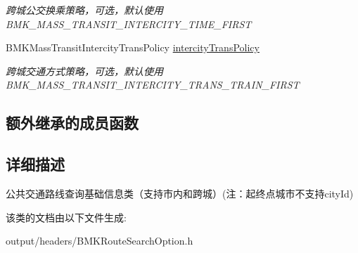 \begin{DoxyCompactItemize}
\begin{DoxyCompactList}\small\item\em 跨城公交换乘策略，可选，默认使用\+B\+M\+K\+\_\+\+M\+A\+S\+S\+\_\+\+T\+R\+A\+N\+S\+I\+T\+\_\+\+I\+N\+T\+E\+R\+C\+I\+T\+Y\+\_\+\+T\+I\+M\+E\+\_\+\+F\+I\+R\+S\+T \end{DoxyCompactList}\item 
\hypertarget{interface_b_m_k_mass_transit_route_plan_option_ae19aae7860e23063295101f1cc0000d5}{}B\+M\+K\+Mass\+Transit\+Intercity\+Trans\+Policy \hyperlink{interface_b_m_k_mass_transit_route_plan_option_ae19aae7860e23063295101f1cc0000d5}{intercity\+Trans\+Policy}\label{interface_b_m_k_mass_transit_route_plan_option_ae19aae7860e23063295101f1cc0000d5}

\begin{DoxyCompactList}\small\item\em 跨城交通方式策略，可选，默认使用\+B\+M\+K\+\_\+\+M\+A\+S\+S\+\_\+\+T\+R\+A\+N\+S\+I\+T\+\_\+\+I\+N\+T\+E\+R\+C\+I\+T\+Y\+\_\+\+T\+R\+A\+N\+S\+\_\+\+T\+R\+A\+I\+N\+\_\+\+F\+I\+R\+S\+T \end{DoxyCompactList}\end{DoxyCompactItemize}
\subsection*{额外继承的成员函数}


\subsection{详细描述}
公共交通路线查询基础信息类（支持市内和跨城）(注：起终点城市不支持city\+Id) 

该类的文档由以下文件生成\+:\begin{DoxyCompactItemize}
\item 
output/headers/B\+M\+K\+Route\+Search\+Option.\+h\end{DoxyCompactItemize}
